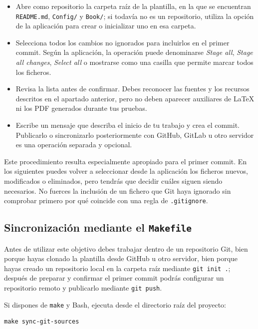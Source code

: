 \begin{itemize}
  \item Abre como repositorio la carpeta raíz de la plantilla, en la que se encuentran \texttt{README.md}, \texttt{Config/} y \texttt{Book/}; si todavía no es un repositorio, utiliza la opción de la aplicación para crear o inicializar uno en esa carpeta.
  \item Selecciona todos los cambios no ignorados para incluirlos en el primer commit. Según la aplicación, la operación puede denominarse \emph{Stage all}, \emph{Stage all changes}, \emph{Select all} o mostrarse como una casilla que permite marcar todos los ficheros.
  \item Revisa la lista antes de confirmar. Debes reconocer las fuentes y los recursos descritos en el apartado anterior, pero no deben aparecer auxiliares de \LaTeX{} ni los PDF generados durante tus pruebas.
  \item Escribe un mensaje que describa el inicio de tu trabajo y crea el commit. Publicarlo o sincronizarlo posteriormente con GitHub, GitLab u otro servidor es una operación separada y opcional.
\end{itemize}

Este procedimiento resulta especialmente apropiado para el primer commit. En los siguientes puedes volver a seleccionar desde la aplicación los ficheros nuevos, modificados o eliminados, pero tendrás que decidir cuáles siguen siendo necesarios. No fuerces la inclusión de un fichero que Git haya ignorado sin comprobar primero por qué coincide con una regla de \texttt{.gitignore}.

\subsection{Sincronización mediante el \texttt{Makefile}}

Antes de utilizar este objetivo debes trabajar dentro de un repositorio Git, bien porque hayas clonado la plantilla desde GitHub u otro servidor, bien porque hayas creado un repositorio local en la carpeta raíz mediante \texttt{git init .}; después de preparar y confirmar el primer commit podrás configurar un repositorio remoto y publicarlo mediante \texttt{git push}.

Si dispones de \texttt{make} y Bash, ejecuta desde el directorio raíz del proyecto:

\begin{verbatim}
make sync-git-sources
\end{verbatim}

